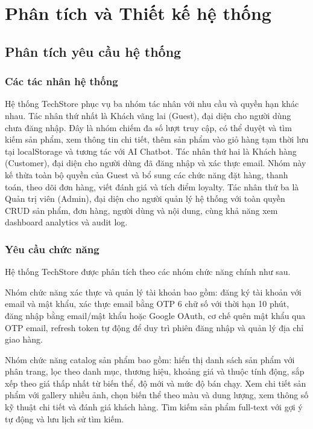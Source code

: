 \chapter{Phân tích và Thiết kế hệ thống}

\section{Phân tích yêu cầu hệ thống}

\subsection{Các tác nhân hệ thống}

Hệ thống TechStore phục vụ ba nhóm tác nhân với nhu cầu và quyền hạn khác nhau. Tác nhân thứ nhất là Khách vãng lai (Guest), đại diện cho người dùng chưa đăng nhập. Đây là nhóm chiếm đa số lượt truy cập, có thể duyệt và tìm kiếm sản phẩm, xem thông tin chi tiết, thêm sản phẩm vào giỏ hàng tạm thời lưu tại localStorage và tương tác với AI Chatbot. Tác nhân thứ hai là Khách hàng (Customer), đại diện cho người dùng đã đăng nhập và xác thực email. Nhóm này kế thừa toàn bộ quyền của Guest và bổ sung các chức năng đặt hàng, thanh toán, theo dõi đơn hàng, viết đánh giá và tích điểm loyalty. Tác nhân thứ ba là Quản trị viên (Admin), đại diện cho người quản lý hệ thống với toàn quyền CRUD sản phẩm, đơn hàng, người dùng và nội dung, cùng khả năng xem dashboard analytics và audit log.

\subsection{Yêu cầu chức năng}

Hệ thống TechStore được phân tích theo các nhóm chức năng chính như sau.

Nhóm chức năng xác thực và quản lý tài khoản bao gồm: đăng ký tài khoản với email và mật khẩu, xác thực email bằng OTP 6 chữ số với thời hạn 10 phút, đăng nhập bằng email/mật khẩu hoặc Google OAuth, cơ chế quên mật khẩu qua OTP email, refresh token tự động để duy trì phiên đăng nhập và quản lý địa chỉ giao hàng.

Nhóm chức năng catalog sản phẩm bao gồm: hiển thị danh sách sản phẩm với phân trang, lọc theo danh mục, thương hiệu, khoảng giá và thuộc tính động, sắp xếp theo giá thấp nhất từ biến thể, độ mới và mức độ bán chạy. Xem chi tiết sản phẩm với gallery nhiều ảnh, chọn biến thể theo màu và dung lượng, xem thông số kỹ thuật chi tiết và đánh giá khách hàng. Tìm kiếm sản phẩm full-text với gợi ý tự động và lưu lịch sử tìm kiếm.

